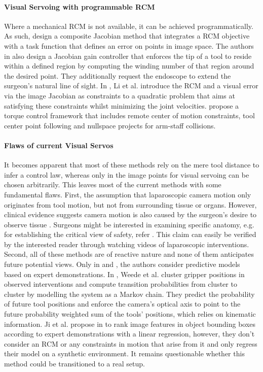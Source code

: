 \paragraph{Visual Servoing with programmable RCM}
Where a mechanical RCM is not available, it can be achieved programmatically. As such, \cite{aghakhani2013task} design a composite Jacobian method that integrates a RCM objective with a task function that defines an error on points in image space. The authors in \cite{yang2019adaptive} also design a Jacobian gain controller that enforces the tip of a tool to reside within a defined region by computing the winding number of that region around the desired point. They additionally request the endoscope to extend the surgeon's natural line of sight. In \cite{li2020accelerated}, Li et al. introduce the RCM and a visual error via the image Jacobian as constraints to a quadratic problem that aims at satisfying these constraints whilst minimizing the joint velocities. \cite{sandoval2021towards} propose a torque control framework that includes remote center of motion constraints, tool center point following and nullspace projects for arm-staff collisions.

\paragraph{Flaws of current Visual Servos} It becomes apparent that most of these methods rely on the mere tool distance to infer a control law, whereas only in \cite{ma2019autonomous, ma2020visual, aghakhani2013task, yang2019adaptive, li2020accelerated} the image points for visual servoing can be chosen arbitrarily. This leaves most of the current methods with some fundamental flaws. First, the assumption that laparoscopic camera motion only originates from tool motion, but not from surrounding tissue or organs. However, clinical evidence suggests camera motion is also caused by the surgeon’s desire to observe tissue \cite{ellis2016task}. Surgeons might be interested in examining specific anatomy, e.g. for establishing the critical view of safety, refer . This claim can easily be verified by the interested reader through watching videos of laparoscopic interventions. Second, all of these methods are of reactive nature and none of them anticipates future potential views. Only in \cite{weede2011intelligent} and \cite{ji2018learning}, the authors consider predictive models based on expert demonstrations. In \cite{weede2011intelligent}, Weede et al. cluster gripper positions in observed interventions and compute transition probabilities from cluster to cluster by modelling the system as a Markov chain. They predict the probability of future tool positions and enforce the camera's optical axis to point to the future probability weighted sum of the tools' positions, which relies on kinematic information. Ji et al. propose in \cite{ji2018learning} to rank image features in object bounding boxes according to expert demonstrations with a linear regression, however, they don't consider an RCM or any constraints in motion that arise from it and only regress their model on a synthetic environment. It remains questionable whether this method could be transitioned to a real setup.

